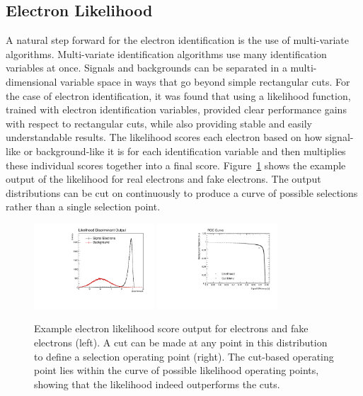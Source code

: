 \subsection{Electron Likelihood}

A natural step forward for the electron identification is the use of multi-variate algorithms. Multi-variate identification algorithms use many identification variables at once. Signals and backgrounds can be separated in a multi-dimensional variable space in ways that go beyond simple rectangular cuts. For the case of electron identification, it was found that using a likelihood function, trained with electron identification variables, provided clear performance gains with respect to rectangular cuts, while also providing stable and easily understandable results. The likelihood scores each electron based on how signal-like or background-like it is for each identification variable and then multiplies these individual scores together into a final score. Figure~\ref{figure:electron_lh_example} shows the example output of the likelihood for real electrons and fake electrons. The output distributions can be cut on continuously to produce a curve of possible selections rather than a single selection point. 

\begin{figure}[!t]
\centering 
\includegraphics[width=0.40\textwidth]{figs/electron/example_lh_output}
\includegraphics[width=0.40\textwidth]{figs/electron/example_roccurve}
\caption{Example electron likelihood score output for electrons and fake electrons (left). A cut can be made at any point in this distribution to define a selection operating point (right). The cut-based operating point lies within the curve of possible likelihood operating points, showing that the likelihood indeed outperforms the cuts.} 
\label{figure:electron_lh_example}
\end{figure}



